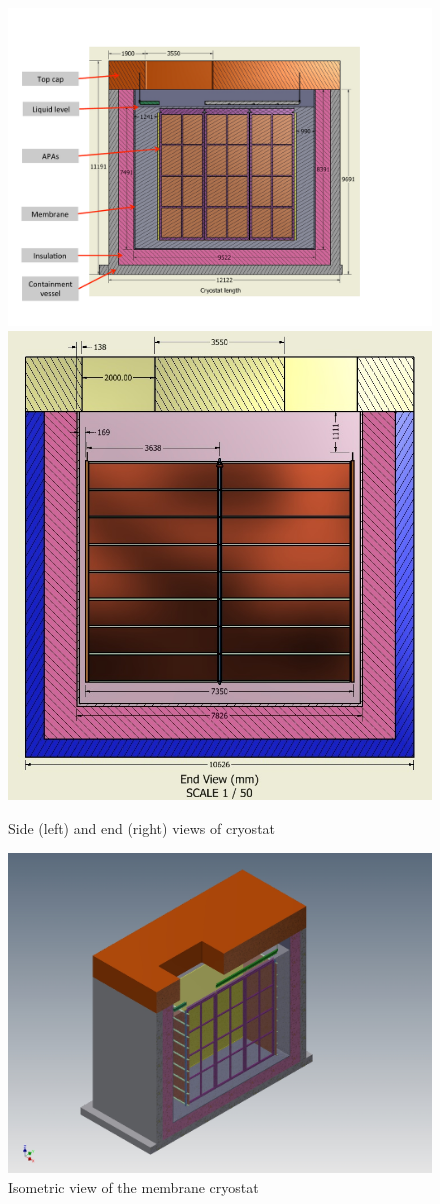 \begin{figure}
\begin{center}
\includegraphics[width=.53\textwidth]{figures/cryostat-side-view} 
\includegraphics[width=.42\textwidth]{figures/cryostat-westend-view}  
\caption[Views of cryostat]{\label{fig:cryostat-views} Side (left) and end (right) views of cryostat}
\end{center}
\end{figure}

\begin{figure}[htb]
\begin{center}
\includegraphics[width=.75\textwidth]{figures/cryostat-isometric-view} 
\caption[Isometric view of cryostat]{\label{fig:cryostat-views} Isometric view of the membrane cryostat}
\end{center}
\end{figure}

